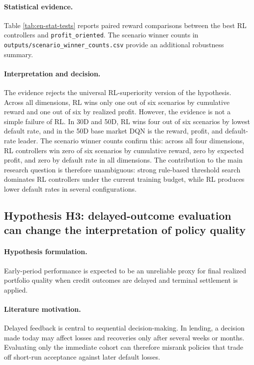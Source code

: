 \documentclass[12pt,a4paper]{article}
\begin{document}
\paragraph{Statistical evidence.}
Table \ref{tab:en-stat-tests} reports paired reward comparisons between the best RL controllers and \texttt{profit\_oriented}. The scenario winner counts in \texttt{outputs/scenario\_winner\_counts.csv} provide an additional robustness summary.

\paragraph{Interpretation and decision.}
The evidence rejects the universal RL-superiority version of the hypothesis. Across all dimensions, RL wins only one out of six scenarios by cumulative reward and one out of six by realized profit. However, the evidence is not a simple failure of RL. In 30D and 50D, RL wins four out of six scenarios by lowest default rate, and in the 50D base market DQN is the reward, profit, and default-rate leader. The scenario winner counts confirm this: across all four dimensions, RL controllers win zero of six scenarios by cumulative reward, zero by expected profit, and zero by default rate in all dimensions. The contribution to the main research question is therefore unambiguous: strong rule-based threshold search dominates RL controllers under the current training budget, while RL produces lower default rates in several configurations.

\subsection{Hypothesis H3: delayed-outcome evaluation can change the interpretation of policy quality}

\paragraph{Hypothesis formulation.}
Early-period performance is expected to be an unreliable proxy for final realized portfolio quality when credit outcomes are delayed and terminal settlement is applied.

\paragraph{Literature motivation.}
Delayed feedback is central to sequential decision-making. In lending, a decision made today may affect losses and recoveries only after several weeks or months. Evaluating only the immediate cohort can therefore misrank policies that trade off short-run acceptance against later default losses.
\end{document}
